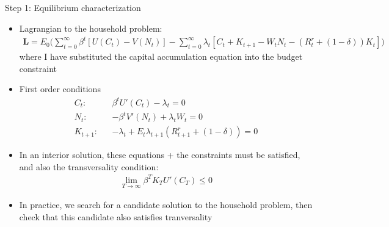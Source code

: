 \documentclass[9pt,xcolor={dvipsnames}]{beamer}
\newcommand{\bit}{\begin{itemize}}
\newcommand{\eit}{\end{itemize}}
\newcommand{\bc}{\color{blue}}
\begin{document}
\begin{frame}{Step 1: Equilibrium characterization}

\bit
\setlength\itemsep{1.5em}

\item Lagrangian to the household problem:
\begin{eqnarray}
\mathbf{L} = E_0 \Bigg(\sum_{t=0}^{\infty} \beta^t \left[U(C_t)- V(N_t) \right]-\sum_{t=0}^{\infty} \lambda_t \left[ C_t + K_{t+1} - W_t N_t - (R^{r}_t + (1-\delta))K_t \right] \Bigg) \nonumber
\end{eqnarray}
where I have substituted the capital accumulation equation into the budget constraint

\item First order conditions
\begin{eqnarray}
C_t: && \beta^t U'(C_t) - \lambda_t = 0 \nonumber \\
N_t: && -\beta^t V'(N_t) + \lambda_tW_t = 0 \nonumber \\
K_{t+1}: && -\lambda_t   + E_t\lambda_{t+1} (R^{r}_{t+1}+(1-\delta)) = 0 \nonumber
\end{eqnarray}

\item In an {\bc interior solution}, these equations + the constraints must be satisfied, and also the {\bc transversality condition}:
\begin{eqnarray}
\lim_{T \to \infty} \beta^T K_{T} U'(C_T) \leq 0 \nonumber
\end{eqnarray}

\item In practice, we search for a candidate solution to the household problem, then check that this candidate also satisfies tranversality

\eit

\end{frame}
\end{document}
